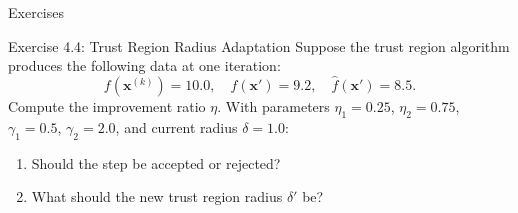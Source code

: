 \documentclass[aspectratio=169,10pt]{beamer}
\newcommand{\bx}{\mathbf{x}}
\begin{document}
\begin{frame}[allowframebreaks]{Exercises}
  \begin{block}{Exercise 4.4: Trust Region Radius Adaptation}
    Suppose the trust region algorithm produces the following data at
    one iteration:
    \[
      f(\bx^{(k)}) = 10.0,\quad
      f(\bx') = 9.2,\quad
      \hat{f}(\bx') = 8.5.
    \]
    Compute the improvement ratio $\eta$.  With parameters $\eta_1 =
    0.25$, $\eta_2 = 0.75$, $\gamma_1 = 0.5$, $\gamma_2 = 2.0$, and
    current radius $\delta = 1.0$:
    \begin{enumerate}
      \item Should the step be accepted or rejected?
      \item What should the new trust region radius $\delta'$ be?
    \end{enumerate}
  \end{block}

\end{frame}
\end{document}

